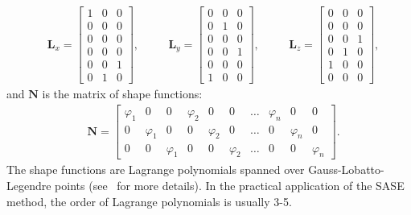 \documentclass[preprint,12pt]{elsarticle}
\newcommand{\matr}[1]{\mathbf{#1}} %
\begin{document}
	 \begin{equation}
	 \begin{split}
		 & \matr{L}_x = \left[\begin{array}{ccc} 
		 1 & 0 & 0  \\[4pt]
		 0&0&0\\[4pt]
		 0 &0&0  \\[4pt]
		 0&0&0\\[4pt]
		 0&0&1\\[4pt]
		  0&1&0 
		 \end{array} \right], 
	 \end{split} \quad 
	  \begin{split}
		  & \matr{L}_y = \left[\begin{array}{ccc} 
		 0&0&0\\[4pt]
		 0&1&0\\[4pt]
		 0 &0&0\\[4pt]
		 0&0&1\\[4pt]
		 0&0&0\\[4pt]
		 1&0&0 
		 \end{array} \right],
	 \end{split} \quad 
	 \begin{split}
	& \matr{L}_z = \left[\begin{array}{ccc} 
	0&0&0\\[4pt]
	0&0&0\\[4pt]
	0 &0&1\\[4pt]
	0&1&0\\[4pt]
	1&0&0\\[4pt]
	0&0&0 
	\end{array} \right],
	\end{split}
	 \label{eq:selectors}
	 \end{equation} 
	 and \(\matr{N}\) is the matrix of shape functions:
	  \begin{equation}
	 \begin{split}
	 & \matr{N} = \left[\begin{array}{cccccccccc} 
	 \varphi_1 & 0 & 0  & \varphi_2 & 0 & 0& \ldots & \varphi_n & 0 & 0\\[4pt]
	 0&\varphi_1&0 &  0&\varphi_2&0 & \ldots&  0&\varphi_n&0\\[4pt]
	 0 &0&\varphi_1 & 0 &0&\varphi_2 & \ldots& 0 &0&\varphi_n 
	 \end{array} \right]. 
	 \end{split}
	 \end{equation}
The shape functions are Lagrange polynomials spanned over Gauss-Lobatto-Legendre points (see~\cite{Kudela2007} for more details). 
In the practical application of the SASE method, the order of Lagrange polynomials is usually 3-5.
	 
\end{document}
